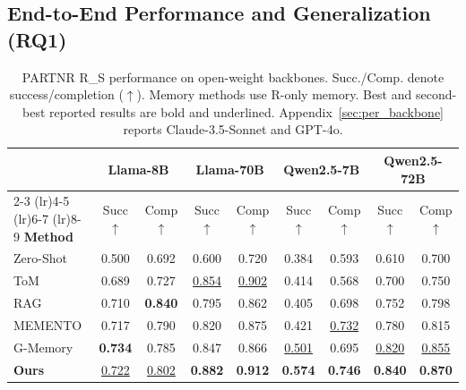 \documentclass{article}
\theoremstyle{plain}
\theoremstyle{definition}
\theoremstyle{remark}
\begin{document}
\subsection{End-to-End Performance and Generalization (RQ1)}
\label{subsec:main_results}
\label{subsec:generalization}

\begin{table}[H]
\centering
\caption{PARTNR R\_S performance on open-weight backbones. Succ./Comp. denote success/completion ($\uparrow$). Memory methods use R-only memory. Best and second-best reported results are bold and underlined. Appendix~\ref{sec:per_backbone} reports Claude-3.5-Sonnet and GPT-4o.}
\label{tab:main_results_task}
\small
\begin{tabular}{@{}l|cc|cc|cc|cc@{}}
\toprule
& \multicolumn{2}{c|}{\textbf{Llama-8B}}
& \multicolumn{2}{c|}{\textbf{Llama-70B}}
& \multicolumn{2}{c|}{\textbf{Qwen2.5-7B}}
& \multicolumn{2}{c}{\textbf{Qwen2.5-72B}} \\
\cmidrule(lr){2-3} \cmidrule(lr){4-5} \cmidrule(lr){6-7} \cmidrule(lr){8-9}
\textbf{Method}
& Succ$\uparrow$ & Comp$\uparrow$
& Succ$\uparrow$ & Comp$\uparrow$
& Succ$\uparrow$ & Comp$\uparrow$
& Succ$\uparrow$ & Comp$\uparrow$ \\
\midrule
Zero-Shot & 0.500 & 0.692 & 0.600 & 0.720 & 0.384 & 0.593 & 0.610 & 0.700 \\
ToM       & 0.689 & 0.727 & \underline{0.854} & \underline{0.902} & 0.414 & 0.568 & 0.700 & 0.750 \\
RAG       & 0.710 & \textbf{0.840} & 0.795 & 0.862 & 0.405 & 0.698 & 0.752 & 0.798 \\
MEMENTO   & 0.717 & 0.790 & 0.820 & 0.875 & 0.421 & \underline{0.732} & 0.780 & 0.815 \\
G-Memory  & \textbf{0.734} & 0.785 & 0.847 & 0.866 & \underline{0.501} & 0.695 & \underline{0.820} & \underline{0.855} \\
\midrule
\textbf{Ours} & \underline{0.722} & \underline{0.802} & \textbf{0.882} & \textbf{0.912} & \textbf{0.574} & \textbf{0.746} & \textbf{0.840} & \textbf{0.870} \\
\bottomrule
\end{tabular}
\end{table}
\end{document}

